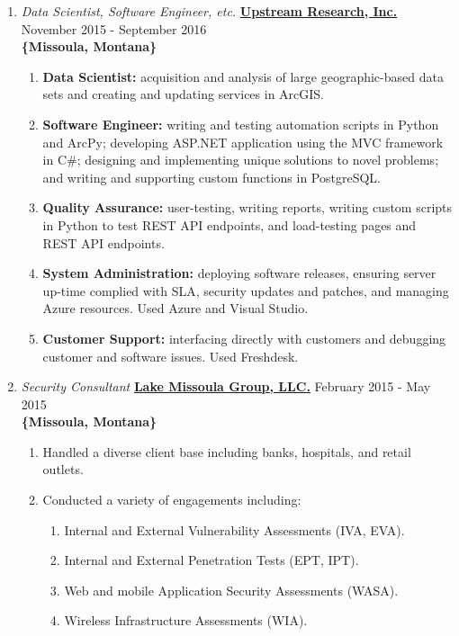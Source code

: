 \documentclass[oneside]{article}%
\begin{document}
\begin{enumerate}[]
\begin{enumerate}[*]
		\end{enumerate}
	\item \textit{Data Scientist, Software Engineer, etc.} \textbf{\href{https://upstreamresearch.com}{Upstream Research, Inc.}} \hfill November 2015 - September 2016\\
		\textbf{\{Missoula, Montana\}}
		\begin{enumerate}[*]
			\item \textbf{Data Scientist:} acquisition and analysis of large geographic-based data sets and creating and updating services in ArcGIS.
			\item \textbf{Software Engineer:} writing and testing automation scripts in Python and ArcPy; developing ASP.NET application using the MVC framework in C\#; designing and implementing unique solutions to novel problems; and writing and supporting custom functions in PostgreSQL.
			\item \textbf{Quality Assurance:} user-testing, writing reports, writing custom scripts in Python to test REST API endpoints, and load-testing pages and REST API endpoints.
			\item \textbf{System Administration:} deploying software releases, ensuring server up-time complied with SLA, security updates and patches, and managing Azure resources. Used Azure and Visual Studio.
			\item \textbf{Customer Support:} interfacing directly with customers and debugging customer and software issues. Used Freshdesk.
		\end{enumerate}
	\item \textit{Security Consultant} \textbf{\href{https://lmgsecurity.com/}{Lake Missoula Group, LLC.}} \hfill February 2015 - May 2015\\
		\textbf{\{Missoula, Montana\}}
		\begin{enumerate}[*]
			\item Handled a diverse client base including banks, hospitals, and retail outlets.
			\item Conducted a variety of engagements including:
				\begin{enumerate}[.]
					\item Internal and External Vulnerability Assessments (IVA, EVA).
					\item Internal and External Penetration Tests (EPT, IPT).					
					\item Web and mobile Application Security Assessments (WASA).
					\item Wireless Infrastructure Assessments (WIA).

\end{enumerate}
\end{enumerate}
\end{enumerate}
\end{document}
